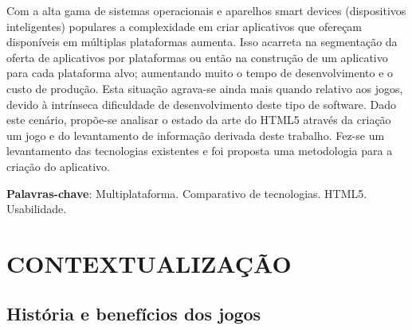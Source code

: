 \documentclass{article}
\begin{document}
Com a alta gama de sistemas operacionais e aparelhos smart devices (dispositivos inteligentes) populares a complexidade em criar aplicativos que ofereçam disponíveis em múltiplas plataformas aumenta. Isso acarreta na segmentação da oferta de aplicativos por plataformas ou então na construção de um aplicativo para cada plataforma alvo; aumentando muito o tempo de desenvolvimento e o custo de produção. Esta situação agrava-se ainda mais quando relativo aos jogos, devido à intrínseca dificuldade de desenvolvimento deste tipo de software. Dado este cenário, propõe-se analisar o estado da arte do HTML5 através da criação um jogo e do levantamento de informação derivada deste trabalho.  Fez-se um levantamento das tecnologias existentes e foi proposta uma metodologia para a criação do aplicativo.

\textbf{Palavras-chave}: Multiplataforma. Comparativo de tecnologias. HTML5. Usabilidade.

\newpage

\listoffigures  
\listoftables
\newpage

\tableofcontents
\newpage

\section{CONTEXTUALIZAÇÃO}
\subsection{História e benefícios dos jogos}
\end{document}
